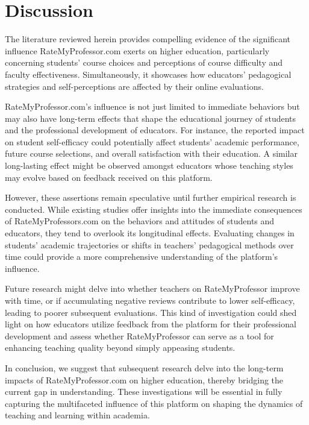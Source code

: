 \documentclass[man, 12pt]{apa7}
\begin{document}

\section{Discussion}

The literature reviewed herein provides compelling evidence of the significant influence RateMyProfessor.com exerts on higher education, particularly concerning students' course choices and perceptions of course difficulty and faculty effectiveness. Simultaneously, it showcases how educators' pedagogical strategies and self-perceptions are affected by their online evaluations. 

RateMyProfessor.com's influence is not just limited to immediate behaviors but may also have long-term effects that shape the educational journey of students and the professional development of educators. For instance, the reported impact on student self-efficacy could potentially affect students' academic performance, future course selections, and overall satisfaction with their education. A similar long-lasting effect might be observed amongst educators whose teaching styles may evolve based on feedback received on this platform.

However, these assertions remain speculative until further empirical research is conducted. While existing studies offer insights into the immediate consequences of RateMyProfessors.com on the behaviors and attitudes of students and educators, they tend to overlook its longitudinal effects. Evaluating changes in students' academic trajectories or shifts in teachers' pedagogical methods over time could provide a more comprehensive understanding of the platform's influence. 

Future research might delve into whether teachers on RateMyProfessor improve with time, or if accumulating negative reviews contribute to lower self-efficacy, leading to poorer subsequent evaluations. This kind of investigation could shed light on how educators utilize feedback from the platform for their professional development and assess whether RateMyProfessor can serve as a tool for enhancing teaching quality beyond simply appeasing students.

In conclusion, we suggest that subsequent research delve into the long-term impacts of RateMyProfessor.com on higher education, thereby bridging the current gap in understanding. These investigations will be essential in fully capturing the multifaceted influence of this platform on shaping the dynamics of teaching and learning within academia.
\end{document}
